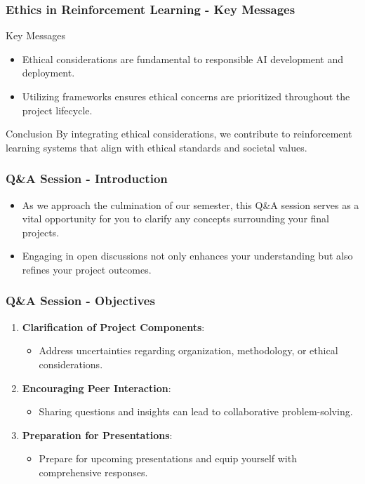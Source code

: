 \documentclass[aspectratio=169]{beamer}
\begin{document}
\begin{frame}[fragile]
    \frametitle{Ethics in Reinforcement Learning - Key Messages}
    \begin{block}{Key Messages}
        \begin{itemize}
            \item Ethical considerations are fundamental to responsible AI development and deployment.
            \item Utilizing frameworks ensures ethical concerns are prioritized throughout the project lifecycle.
        \end{itemize}
    \end{block}
    \begin{block}{Conclusion}
        By integrating ethical considerations, we contribute to reinforcement learning systems that align with ethical standards and societal values.
    \end{block}
\end{frame}

\begin{frame}[fragile]
    \frametitle{Q\&A Session - Introduction}
    \begin{itemize}
        \item As we approach the culmination of our semester, this Q\&A session serves as a vital opportunity for you to clarify any concepts surrounding your final projects.
        \item Engaging in open discussions not only enhances your understanding but also refines your project outcomes.
    \end{itemize}
\end{frame}

\begin{frame}[fragile]
    \frametitle{Q\&A Session - Objectives}
    \begin{enumerate}
        \item \textbf{Clarification of Project Components}:
            \begin{itemize}
                \item Address uncertainties regarding organization, methodology, or ethical considerations.
            \end{itemize}
        \item \textbf{Encouraging Peer Interaction}:
            \begin{itemize}
                \item Sharing questions and insights can lead to collaborative problem-solving.
            \end{itemize}
        \item \textbf{Preparation for Presentations}:
            \begin{itemize}
                \item Prepare for upcoming presentations and equip yourself with comprehensive responses.
            \end{itemize}
    \end{enumerate}
\end{frame}
\end{document}
